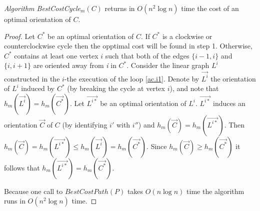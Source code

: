 \bigskip
\begin{theorem}\label{t.cycle-m}
\emph{Algorithm BestCostCycle}$_m(C)$ returns in $O(n^2 \log n)$ time the cost of an optimal 
orientation of $C$.
\end{theorem}
\begin{proof}

Let $C^*$ be an optimal orientation 
of $C$.
If $C^*$ is a clockwise or counterclockwise cycle then the opptimal cost will be found in step 1.
Otherwise, $C^*$ contains at least one vertex $i$ such that both of the edges $\{i-1,i\}$ and $\{i,i+1\}$
are oriented away from \textit{i} in $C^*$.  Consider the linear graph $L^i$ constructed in
the $i$-the execution of the loop \ref{ac.i1}. Denote by $\vec{L^i}$ the orientation of $L^i$ 
induced by $C^*$  (by breaking the cycle at vertex $i$), and note that 
$h_m(\vec{L^i})=h_m(\vec{C^*})$. Let $\vec{L^{i*}}$ be an optimal orientation of $L^i$.
$\vec{L^{i*}}$ induces an orientation $\vec{C}$ of $C$ (by identifying $i'$ with $i''$)
and $h_m(\vec{C})=h_m(\vec{L^{i*}})$.  
Then $h_m(\vec{C})=h_m(\vec{L^{i*}})\leq h_m(\vec{L^i})=h_m(\vec{C^*})$.
Since $h_m(\vec{C})\geq h_m(\vec{C^*})$ it follows that $h_m(\vec{L^{i*}})= h_m(\vec{C^*})$.

Because one call to $BestCostPath(P)$ takes $O(n \log n)$ time the algorithm runs in $O(n^2 \log n)$ time.
\end{proof}
